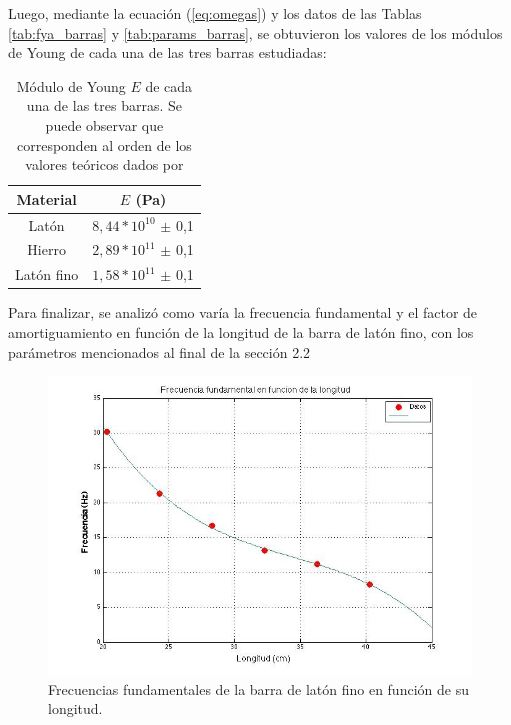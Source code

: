 \documentclass[twoside,twocolumn,a4paper]{article}
\begin{document}
Luego, mediante la ecuaci\'on (\ref{eq:omegas}) y los datos de las Tablas \ref{tab:fya_barras} y \ref{tab:params_barras}, se obtuvieron los valores de los m\'odulos de Young de cada una de las tres barras estudiadas:

\begin{table}[H]
\centering
\caption{M\'odulo de Young $E$ de cada una de las tres barras. Se puede observar que corresponden al orden de los valores te\'oricos dados por \cite{teo:ashby}}

\label{tab:young_barras}
\begin{tabular}{|c|c|}
\hline
Material & $E$ (Pa)\\ \hline
Lat\'on & $8,44 * 10^{10}$ $\pm$ 0,1\\ \hline
Hierro & $2,89 * 10^{11}$ $\pm$ 0,1\\ \hline
Lat\'on fino & $1,58 * 10^{11}$ $\pm$ 0,1\\ \hline
\end{tabular}
\end{table}

Para finalizar, se analiz\'o como var\'ia la frecuencia fundamental y el factor de amortiguamiento en funci\'on de la longitud de la barra de lat\'on fino, con los par\'ametros mencionados al final de  la secci\'on 2.2

\begin{figure}[H]
\includegraphics[width=\linewidth]{fvsl.jpg}
\caption{Frecuencias fundamentales de la barra de lat\'on fino en funci\'on de su longitud.}
\label{fig:fvsl}
\end{figure}
\end{document}
